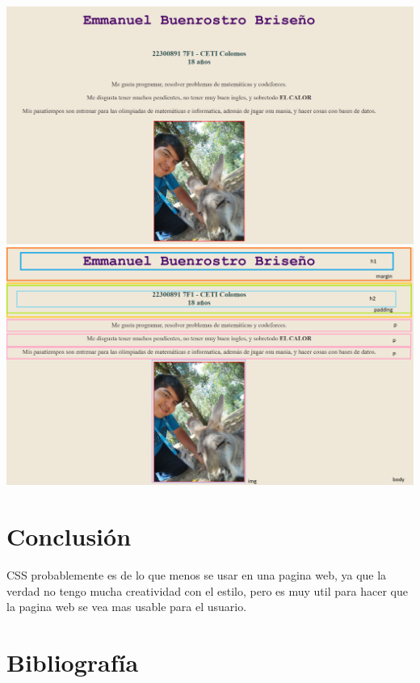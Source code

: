 \documentclass[11pt]{scrartcl}
\begin{document}
\begin{center}
    \includegraphics[scale=0.4]{Presentacionimg.png}
    \includegraphics[scale=0.4]{presentacionpartes.png}
\end{center}




\section{Conclusión}

CSS probablemente es de lo que menos se usar en una pagina web, 
ya que la verdad no tengo mucha creatividad con el estilo, pero es muy util 
para hacer que la pagina web se vea mas usable para el usuario. 

    \section{Bibliografía}
\nocite{*}
\printbibliography[heading=bibintoc,title={.}]

    
\end{document}
